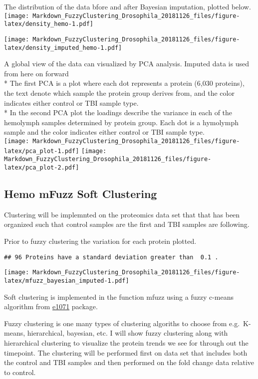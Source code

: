 \documentclass[]{article}
\begin{document}
The distribution of the data bfore and after Bayesian imputation,
plotted below.
\texttt{[image: Markdown\_FuzzyClustering\_Drosophila\_20181126\_files/figure-latex/density\_hemo-1.pdf]}

\texttt{[image: Markdown\_FuzzyClustering\_Drosophila\_20181126\_files/figure-latex/density\_imputed\_hemo-1.pdf]}

A global view of the data can visualized by PCA analysis. Imputed data
is used from here on forward\\
* The first PCA is a plot where each dot represents a protein (6,030
proteins), the text denote which sample the protein group derives from,
and the color indicates either control or TBI sample type.\\
* In the second PCA plot the loadings describe the variance in each of
the hemolymph samples determined by protein group. Each dot is a
hymolymph sample and the color indicates either control or TBI sample
type.\\
\texttt{[image: Markdown\_FuzzyClustering\_Drosophila\_20181126\_files/figure-latex/pca\_plot-1.pdf]}
\texttt{[image: Markdown\_FuzzyClustering\_Drosophila\_20181126\_files/figure-latex/pca\_plot-2.pdf]}

\subsection{Hemo mFuzz Soft
Clustering}\label{hemo-mfuzz-soft-clustering}

Clustering will be implemnted on the proteomics data set that that has
been organized such that control samples are the first and TBI samples
are following.

Prior to fuzzy clustering the variation for each protein plotted.

\begin{verbatim}
## 96 Proteins have a standard deviation greater than  0.1 .
\end{verbatim}

\texttt{[image: Markdown\_FuzzyClustering\_Drosophila\_20181126\_files/figure-latex/mfuzz\_bayesian\_imputed-1.pdf]}

Soft clustering is implemented in the function mfuzz using a fuzzy
c-means algorithm from
\href{https://cran.r-project.org/web/packages/e1071/e1071.pdf}{e1071}
package.

Fuzzy clustering is one many types of clustering algoriths to choose
from e.g.~K-means, hierarchical, bayesian, etc. I will show fuzzy
clustering along with hierarchical clustering to visualize the protein
trends we see for through out the timepoint. The clustering will be
performed first on data set that includes both the control and TBI
samples and then performed on the fold change data relative to control.
\end{document}
